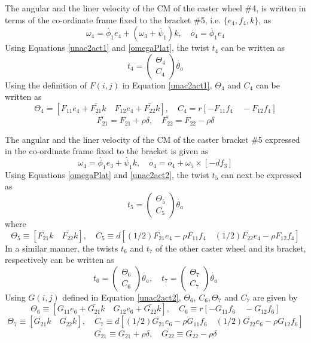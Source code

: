  The angular and the liner velocity of the CM of the caster wheel  \#4, is  written in terms of the co-ordinate frame fixed to the bracket \#5, i.e. $\{e_4,f_4,k\}$, as
\begin{equation}
\label{omegacastor1}
\omega_4=\dot{\phi_1}e_4+(\omega_3+\dot{\psi_1})k, \quad
\dot{o_4}=\dot{\phi_1}e_4
\end{equation}
Using Equations \ref{unac2act1} and \ref{omegaPlat}, the twist $t_4$ can be written as
\begin{equation}
\label{twist4}
t_4=\begin{pmatrix}
\Theta_4\\C_4
\end{pmatrix}\dot{\theta_a}
\end{equation}
Using the definition of $F(i,j)$ in  Equation \ref{unac2act1}, $\Theta_4$ and $C_4$ can be written as 
\[ \Theta_4=[F_{11}e_4+\bar{F_{21}}k \quad F_{12}e_4+\bar{F_{22}}k],\quad 
C_4=r[-F_{11}f_4 \quad -F_{12}f_4]\]
\[\bar{F_{21}}=F_{21}+\rho \delta, \quad \bar{F_{22}}=F_{22}-\rho\delta\]

The angular and the liner velocity of the CM of the caster bracket \#5  expressed in the co-ordinate frame fixed to the bracket is given as
\begin{equation}
\omega_4=\dot{\phi_1}e_3+\dot{\psi_1}k, \quad
\dot{o_4}=\dot{o_4}+\omega_5\times [-df_3]
\end{equation}
Using Equations   \ref{omegaPlat} and \ref{unac2act2}, the twist $t_5$ can next  be expressed as
\begin{equation}
\label{twist5}
t_5=\begin{pmatrix}
\Theta_5\\C_5
\end{pmatrix}\dot{\theta_a}
\end{equation}
where
\[ \Theta_5 \equiv [\bar{F_{21}}k \quad \bar{F_{22}}k],\quad 
C_5\equiv d[(1/2)\bar{F_{21}}e_4-\rho F_{11}f_4 \quad (1/2)\bar{F_{22}}e_4-\rho F_{12}f_4]\]
In a similar manner, the twists $t_6$ and $t_7$  of the other caster wheel and its bracket, respectively can be written as 
\begin{equation}
\label{twist6}
t_6=\begin{pmatrix}
\Theta_6\\C_6
\end{pmatrix}\dot{\theta_a}, \quad t_7=\begin{pmatrix}
\Theta_7\\C_7
\end{pmatrix}\dot{\theta_a}
\end{equation}
Using  $G(i,j)$ defined in  Equation \ref{unac2act2}, $\Theta_6$, $C_6, \Theta_7$ and $C_7$ are given by
\[ \Theta_6 \equiv [G_{11}e_6+\bar{G_{21}}k \quad G_{12}e_6+\bar{G_{22}}k],\quad 
C_6 \equiv r[-G_{11}f_6 \quad -G_{12}f_6]\]
\[ \Theta_7 \equiv [\bar{G_{21}}k \quad \bar{G_{22}}k],\quad 
C_7 \equiv d[(1/2)\bar{G_{21}}e_6-\rho G_{11}f_6 \quad (1/2)\bar{G_{22}}e_6-\rho G_{12}f_6]\]
\[\bar{G_{21}} \equiv G_{21}+\rho \delta, \quad \bar{G_{22}}\equiv G_{22}-\rho\delta\] 
